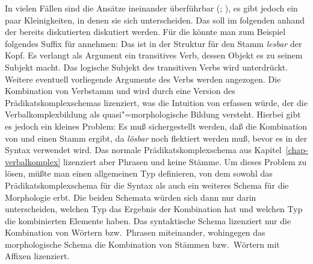 In vielen Fällen sind die Ansätze ineinander überführbar (\citealp[--169]{Koenig99a}; \citealp[Kapitel~6.2.5.2]{Mueller2002b}),
es gibt jedoch ein paar Kleinigkeiten, in denen sie sich unterscheiden. Das soll im folgenden
anhand der bereits diskutierten \bard diskutiert werden.
Für die \bard könnte man zum Beispiel folgendes Suffix für  annehmen:
\eas
{}%
\zs
Das \bars ist in der Struktur für den Stamm \emph{lesbar} der Kopf. Es verlangt als Argument ein transitives
Verb, dessen Objekt  es zu seinem Subjekt macht. Das logische Subjekt des transitiven Verbs wird unterdrückt.
Weitere eventuell vorliegende Argumente des Verbs  werden angezogen.
Die Kombination von Verbstamm und  wird durch eine Version des Prädikatskomplexschemas lizenziert,
was die Intuition von \citet{Bierwisch90a} erfassen würde, der die Verbalkomplexbildung als quasi"=morphologische
Bildung versteht. Hierbei gibt es jedoch ein kleines Problem: Es muß sichergestellt werden, daß die Kombination
von  und  einen Stamm ergibt, da \emph{lösbar} noch flektiert werden muß, bevor es in
der Syntax verwendet wird. Das normale Prädikatskomplexschema aus Kapitel~\ref{chap-verbalkomplex} lizenziert
aber Phrasen und keine Stämme. Um dieses Problem zu lösen, müßte man einen allgemeinen Typ definieren,
von dem sowohl das Prädikatskomplexschema für die Syntax als auch ein weiteres Schema für die Morphologie erbt.
Die beiden Schemata würden sich dann nur darin unterscheiden, welchen Typ das Ergebnis der Kombination hat und
welchen Typ die kombinierten Elemente haben. Das syntaktische Schema lizenziert nur die Kombination von Wörtern
bzw.\ Phrasen miteinander, wohingegen das morphologische Schema die Kombination von Stämmen bzw.\ Wörtern mit
Affixen lizenziert.


